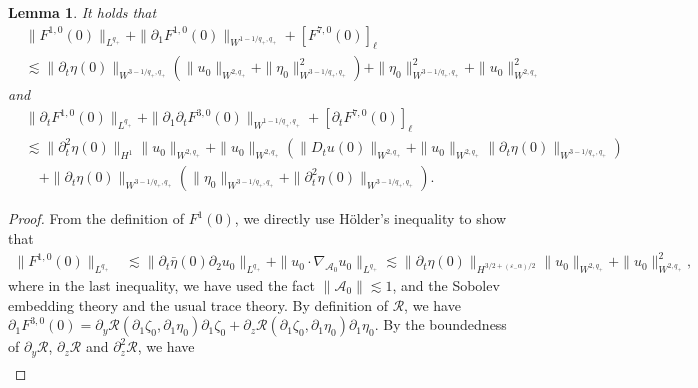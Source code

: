 \documentclass[letterpaper,reqno,10pt,twoside]{amsart}
\newtheorem{lemma}[theorem]{Lemma}
\theoremstyle{definition}
\theoremstyle{remark}
\def\p{\partial}
\begin{document}
\begin{appendix}
			\begin{lemma}\label{est:initial_force3}
				It holds that
				\begin{equation}\label{est:initial_force1}
					\begin{aligned}
						&\|F^{1,0}(0)\|_{L^{q_+}}+\|\p_1F^{1,0}(0)\|_{W^{1-1/q_+,q_+}}
						+[F^{7,0}(0)]_\ell\\
						&\lesssim\|\p_t\eta(0)\|_{W^{3-1/q_+,q_+}}(\|u_0\|_{W^{2,q_+}}+\|\eta_0\|_{W^{3-1/q_+,q_+}}^2)+\|\eta_0\|_{W^{3-1/q_+,q_+}}^2+\|u_0\|_{W^{2,q_+}}^2
					\end{aligned}
				\end{equation}
				and
				\begin{equation}\label{est:initial_force2}
					\begin{aligned}
						&\|\p_tF^{1,0}(0)\|_{L^{q_+}}+\|\p_1\p_tF^{3,0}(0)\|_{W^{1-1/q_+,q_+}}
						+[\p_tF^{7,0}(0)]_\ell\\
						&\lesssim\|\p_t^2\eta(0)\|_{H^1}\|u_0\|_{W^{2,q_+}}+\|u_0\|_{W^{2,q_+}}(\|D_tu(0)\|_{W^{2,q_+}}+\|u_0\|_{W^{2,q_+}}\|\p_t\eta(0)\|_{W^{3-1/q_+,q_+}})\\
						&\quad+\|\p_t\eta(0)\|_{W^{3-1/q_+,q_+}}(\|\eta_0\|_{W^{3-1/q_+,q_+}}+\|\p_t^2\eta(0)\|_{W^{3-1/q_+,q_+}}).
					\end{aligned}
				\end{equation}
			\end{lemma}
			\begin{proof}
				From the definition of $F^1(0)$, we directly use H\"older's inequality to show that
				\begin{equation}\label{est:initial_f111}
					\begin{aligned}
						\|F^{1,0}(0)\|_{L^{q_+}}&\lesssim \|\p_t\bar{\eta}(0)\p_2u_0\|_{L^{q_+}}+\|u_0\cdot\nabla_{\mathcal{A}_0}u_0\|_{L^{q_+}}\lesssim \|\p_t\eta(0)\|_{H^{3/2+(\varepsilon_-\alpha)/2}}\|u_0\|_{W^{2,q_+}}+\|u_0\|_{W^{2,q_+}}^2,
					\end{aligned}
				\end{equation}
				where in the last inequality, we have used the fact $\|\mathcal{A}_0\|\lesssim 1$, and the Sobolev embedding theory and the usual trace theory.
				By definition of $\mathcal{R}$, we have $\p_1F^{3,0}(0)=\p_y\mathcal{R}(\p_1\zeta_0,\p_1\eta_0)\p_1\zeta_0+\p_z\mathcal{R}(\p_1\zeta_0,\p_1\eta_0)\p_1\eta_0$. By the boundedness of $\p_y\mathcal{R}$, $\p_z\mathcal{R}$ and $\p_z^2\mathcal{R}$, we have
				\begin{equation}\label{est:initial_f311}
					\begin{aligned}

\end{aligned}
\end{equation}
\end{proof}
\end{appendix}
\end{document}

